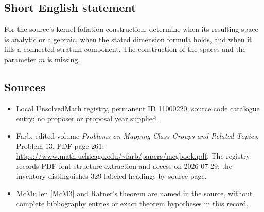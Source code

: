\documentclass[11pt]{article}
\begin{document}
\subsection{Short English statement}
For the source's kernel-foliation construction, determine when its resulting space is analytic or algebraic, when the stated dimension formula holds, and when it fills a connected stratum component. The construction of the spaces and the parameter $m$ is missing.
\subsection{Sources}
\begin{itemize}
\item Local UnsolvedMath registry, permanent ID 11000220, source code catalogue entry; no proposer or proposal year supplied.
\item Farb, edited volume \emph{Problems on Mapping Class Groups and Related Topics}, Problem 13, PDF page 261; \url{https://www.math.uchicago.edu/~farb/papers/mcgbook.pdf}. The registry records PDF-font-structure extraction and access on 2026-07-29; the inventory distinguishes 329 labeled headings by source page.
\item McMullen [McM3] and Ratner's theorem are named in the source, without complete bibliography entries or exact theorem hypotheses in this record.
\end{itemize}
\end{document}
